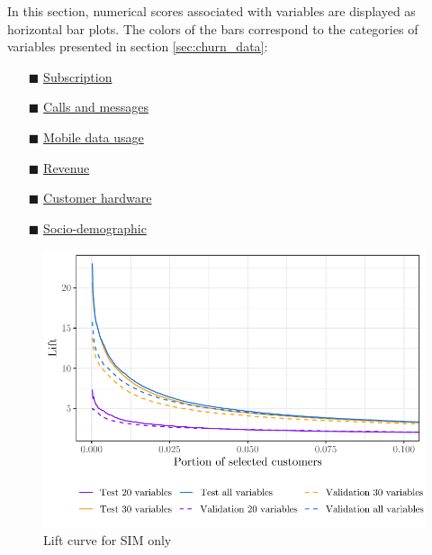 In this section, numerical scores associated with variables are displayed as
horizontal bar plots. The colors of the bars correspond to the
categories of variables presented in section \ref{sec:churn_data}:

\begin{itemize}
    \item[\color{themeyellow}$\blacksquare$] \ul{Subscription}
    \item[\color{themeblue}$\blacksquare$] \ul{Calls and messages}
    \item[\color{darkerblue}$\blacksquare$] \ul{Mobile data usage}
    \item[\color{themepurple}$\blacksquare$] \ul{Revenue}
    \item[\color{darkerorange}$\blacksquare$] \ul{Customer hardware}
    \item[\color{themeorange}$\blacksquare$] \ul{Socio-demographic}
\end{itemize}

\begin{figure}
    \centering
    \includegraphics[width=0.9\linewidth]{figures/lift_simo.pdf}
    \caption{Lift curve for SIM only}
    \label{fig:lift_simo}
\end{figure}

